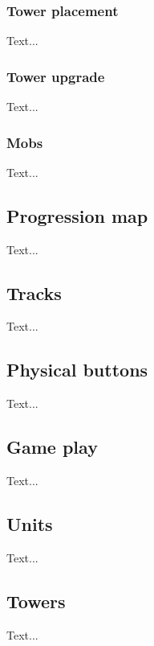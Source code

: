 \subsubsection{Tower placement}

Text...
\subsubsection{Tower upgrade}
Text...
\subsubsection{Mobs}
Text...
\subsection{Progression map}
Text...

\subsection{Tracks}
Text...
\subsection{Physical buttons}
Text...
\subsection{Game play}

Text...
\subsection{Units}

Text...
\subsection{Towers}
Text...
